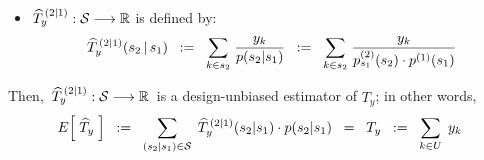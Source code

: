 \begin{theorem}
\begin{itemize}
\item
	$\widehat{T}^{\,(2 \vert 1)}_{y} : \mathcal{S} \longrightarrow \mathbb{R}$ is defined by:
	\begin{equation*}
	\widehat{T}^{\,(2 \vert 1)}_{y}(s_{2}\,\vert\,s_{1})
	\;\; := \;\;
		\underset{k \in s_{2}}{\sum}\;\dfrac{y_{k}}{p(s_{2} \vert s_{1})}
	\;\; := \;\;
		\underset{k \in s_{2}}{\sum}\;\dfrac{y_{k}}{ p^{(2)}_{s_{1}}(s_{2}) \cdot p^{(1)}(s_{1}) }
	\end{equation*}
\end{itemize}
Then, \,$\widehat{T}^{\,(2 \vert 1)}_{y} : \mathcal{S} \longrightarrow \mathbb{R}$\,
is a design-unbiased estimator of $T_{y}$; in other words,
\begin{equation*}
E\!\left[\;\widehat{T}_{y}\;\right]
\;\; := \;\;
	\underset{(s_{2} \vert s_{1})\in\mathcal{S}}{\sum}\;\,
	\widehat{T}^{\,(2 \vert 1)}_{y}(s_{2} \vert s_{1}) \cdot p(s_{2} \vert s_{1})
\;\; = \;\;
	T_{y} \;\; := \;\; \underset{k \in U}{\sum}\;\, y_{k}
\end{equation*}
\end{theorem}

